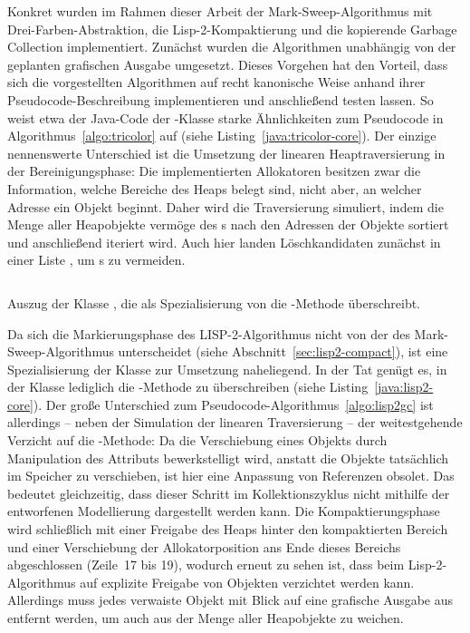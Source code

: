Konkret wurden im Rahmen dieser Arbeit der Mark-Sweep-Algorithmus mit Drei-Farben-Abstraktion, die Lisp-2-Kompaktierung und die kopierende Garbage Collection implementiert.
Zunächst wurden die Algorithmen unabhängig von der geplanten grafischen Ausgabe umgesetzt.
Dieses Vorgehen hat den Vorteil, dass sich die vorgestellten Algorithmen auf recht kanonische Weise anhand ihrer Pseudocode-Beschreibung implementieren und anschließend testen lassen.
So weist etwa der Java-Code der -Klasse starke Ähnlichkeiten zum Pseudocode in Algorithmus~\ref{algo:tricolor} auf (siehe Listing~\ref{java:tricolor-core}).
Der einzige nennenswerte Unterschied ist die Umsetzung der linearen Heaptraversierung in der Bereinigungsphase:
Die implementierten Allokatoren besitzen zwar die Information, welche Bereiche des Heaps belegt sind, nicht aber, an welcher Adresse ein Objekt beginnt.
Daher wird die Traversierung simuliert, indem die Menge  aller Heapobjekte vermöge des s nach den Adressen der Objekte sortiert und anschließend iteriert wird.
Auch hier landen Löschkandidaten zunächst in einer Liste , um s zu vermeiden.

\begin{listing}[t!]
	\inputminted[]{java}{code/Lisp2-core.java}
	\caption[Auszug der Klasse ]{Auszug der Klasse , die als Spezialisierung von  die -Methode überschreibt.}
	\label{java:lisp2-core}
\end{listing}

Da sich die Markierungsphase des LISP-2-Algorithmus nicht von der des Mark-Sweep-Algorithmus unterscheidet (siehe Abschnitt~\ref{sec:lisp2-compact}), ist eine Spezialisierung der Klasse  zur Umsetzung naheliegend.
In der Tat genügt es, in der Klasse lediglich die -Methode zu überschreiben (siehe Listing~\ref{java:lisp2-core}).
Der große Unterschied zum Pseudocode-Algorithmus~\ref{algo:lisp2gc} ist allerdings -- neben der Simulation der linearen Traversierung -- der weitestgehende Verzicht auf die -Methode:
Da die Verschiebung eines Objekts durch Manipulation des Attributs  bewerkstelligt wird, anstatt die Objekte tatsächlich im Speicher zu verschieben, ist hier eine Anpassung von Referenzen obsolet.
Das bedeutet gleichzeitig, dass dieser Schritt im Kollektionszyklus nicht mithilfe der entworfenen Modellierung dargestellt werden kann.
Die Kompaktierungsphase wird schließlich mit einer Freigabe des Heaps hinter den kompaktierten Bereich und einer Verschiebung der Allokatorposition ans Ende dieses Bereichs abgeschlossen (Zeile~17 bis 19), wodurch erneut zu sehen ist, dass beim Lisp-2-Algorithmus auf explizite Freigabe von Objekten verzichtet werden kann.
Allerdings muss jedes verwaiste Objekt mit Blick auf eine grafische Ausgabe aus  entfernt werden, um auch aus der Menge aller Heapobjekte zu weichen.

